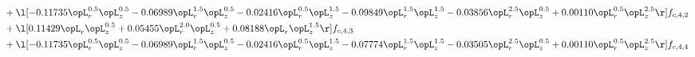 \begin{alignat}{2}
& + \l[  -0.11735 \opL_r^{0.5} \opL_z^{0.5}   -0.06989 \opL_r^{1.5} \opL_z^{0.5}   -0.02416 \opL_r^{0.5} \opL_z^{1.5}   -0.09849 \opL_r^{1.5} \opL_z^{1.5}   -0.03856 \opL_r^{2.5} \opL_z^{0.5} +  0.00110 \opL_r^{0.5} \opL_z^{2.5}  \r] f_{c,4,2} \nonumber \\ 
& + \l[  0.11429 \opL_r \opL_z^{0.5} +  0.05455 \opL_r^{2.0} \opL_z^{0.5} +  0.08188 \opL_r \opL_z^{1.5}  \r] f_{c,4,3} \nonumber \\ 
& + \l[  -0.11735 \opL_r^{0.5} \opL_z^{0.5}   -0.06989 \opL_r^{1.5} \opL_z^{0.5}   -0.02416 \opL_r^{0.5} \opL_z^{1.5}   -0.07774 \opL_r^{1.5} \opL_z^{1.5}   -0.03505 \opL_r^{2.5} \opL_z^{0.5} +  0.00110 \opL_r^{0.5} \opL_z^{2.5}  \r] f_{c,4,4} \nonumber \\ 
\end{alignat} 



